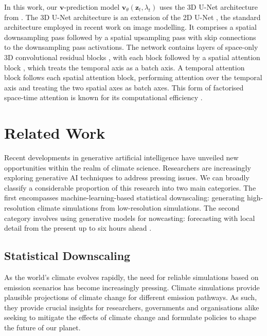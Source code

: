 \documentclass[ oneside,%
                    author={George Herbert},
                    degree={MSci},
                     title={Diffusion Models for Time-Evolving Precipitation Fields},
                  subtitle={}]{dissertation}
\begin{document}
In this work, our $\mathbf{v}$-prediction model $\mathbf{v}_\theta(\mathbf{z}_t, \lambda_t)$ uses the 3D U-Net architecture from \cite{VDM_Ho}. The 3D U-Net architecture is an extension of the 2D U-Net \cite{Ronneberger_U-Net, Salimans_PixelCNN}, the standard architecture employed in recent work on image modelling. It comprises a spatial downsampling pass followed by a spatial upsampling pass with skip connections to the downsampling pass activations. The network contains layers of space-only 3D convolutional residual blocks \cite{VDM_Ho}, with each block followed by a spatial attention block \cite{Vaswani_Attention_is_All_You_Need, Wang_Non-Local_Neural_Networks, Chen_PixelSNAIL}, which treats the temporal axis as a batch axis. A temporal attention block follows each spatial attention block, performing attention over the temporal axis and treating the two spatial axes as batch axes. This form of factorised space-time attention is known for its computational efficiency \cite{Arnab_ViViT, Bertasius_Is_Space-Time_Attention_All_You_Need, Ho_Axial_Attention_in_Multidimensional_Transformers}.

\chapter{Related Work}
\label{chap:background_climate}

Recent developments in generative artificial intelligence have unveiled new opportunities within the realm of climate science. Researchers are increasingly exploring generative AI techniques to address pressing issues. We can broadly classify a considerable proportion of this research into two main categories. The first encompasses machine-learning-based statistical downscaling: generating high-resolution climate simulations from low-resolution simulations. The second category involves using generative models for nowcasting: forecasting with local detail from the present up to six hours ahead \cite{WMO_Guidelines_Nowcasting}.

\section{Statistical Downscaling}
\label{sec:background_climate_downscaling}

As the world's climate evolves rapidly, the need for reliable simulations based on emission scenarios has become increasingly pressing. Climate simulations provide plausible projections of climate change for different emission pathways. As such, they provide crucial insights for researchers, governments and organisations alike seeking to mitigate the effects of climate change and formulate policies to shape the future of our planet. 
\end{document}
